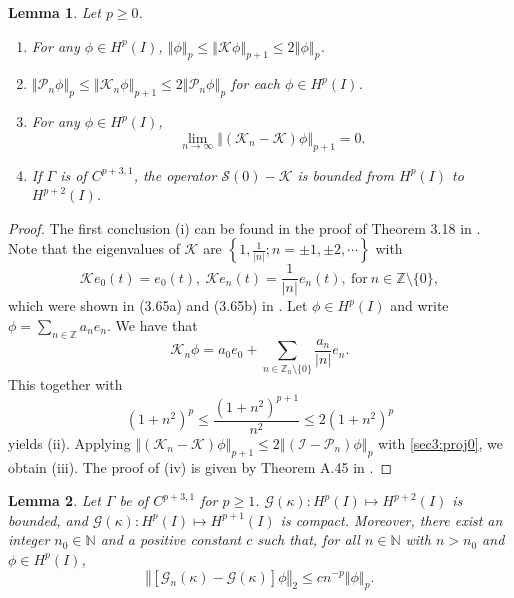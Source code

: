 \documentclass{article}
\newtheorem{lemma}{Lemma}[section]
\newcommand{\abs}[1]{\left\vert#1\right\vert}
\newcommand{\norm}[1]{\left\Vert#1\right\Vert}
\newcommand{\set}[1]{\left\{#1\right\}}
\begin{document}
	\begin{lemma}\label{sec3:lem1}
		Let  $p\geq0$.
				\begin{enumerate}
			\item[\rm (i)]For any $\phi\in H^{p}(I)$, $\norm{\phi}_{p}\leq\norm{\mathcal{K}\phi}_{p+1}\leq 2\norm{\phi}_{p}$. 
			\item[\rm(ii)] $\norm{\mathcal{P}_n\phi}_{p}\leq\norm{\mathcal{K}_n\phi}_{p+1}\leq 2\norm{\mathcal{P}_n\phi}_{p}$ for each $\phi\in H^{p}(I)$.
			\item[\rm(iii)] For any $\phi\in H^{p}(I)$,
			$$\lim_{n\to\infty}\norm{(\mathcal{K}_n-\mathcal{K})\phi}_{p+1}=0.$$
			\item[\rm(iv)] If $\Gamma$ is of $C^{p+3,1}$,
			the operator $\mathcal{S}(0)-\mathcal{K}$ is bounded from $H^{p}(I)$ to $H^{p+2}(I)$.
		\end{enumerate}
	\end{lemma}	
	\begin{proof}
    The first conclusion {\rm (i)} can be found in the proof of  Theorem 3.18 in \cite{Kirsch1996}. 	Note that	
	the eigenvalues of $\mathcal{K}$ are $\set{1,\frac{1}{\abs{n}};n=\pm1,\pm2,\cdots}$ with
	\begin{equation*}
		\mathcal{K}e_0(t)=e_0(t),~\mathcal{K}e_n(t)=\frac{1}{\abs{n}}e_n(t),~\text{for}~n\in\mathbb{Z}\setminus\{0\},
	\end{equation*}
	which were shown in (3.65a) and (3.65b) in \cite{Kirsch1996}. Let $\phi\in H^{p}(I)$ and write
	$\phi=\sum_{n\in\mathbb{Z}}a_ne_n$.
    We have that 
    \begin{equation*}
	\mathcal{K}_n\phi= a_0e_0+\sum_{n\in\mathbb{Z}_n\setminus\{0\}}\dfrac{a_n}{\abs{n}}e_n.
    \end{equation*}
    This together with 
    \begin{equation*}
    (1+n^2)^p\leq\dfrac{(1+n^2)^{p+1}}{n^2}\leq 2(1+n^2)^p
    \end{equation*}
   yields {\rm (ii)}.
   Applying $\norm{(\mathcal{K}_n-\mathcal{K})\phi}_{p+1}\leq 2\norm{(\mathcal{I}-\mathcal{P}_n)\phi}_{p}$ with \eqref{sec3:proj0}, we obtain {\rm (iii)}. The proof of {\rm (iv)} is given by Theorem A.45 in \cite{Kirsch1996}.
   \end{proof}
	
	
	
	\begin{lemma}\label{sec3:lem2}
		Let $\Gamma$ be of $C^{p+3,1}$ for $p\geq1$.  
    $\mathcal{G}(\kappa):H^p(I)\mapsto H^{p+2}(I)$ is bounded, and $\mathcal{G}(\kappa):H^p(I)\mapsto H^{p+1}(I)$ is compact. Moreover,
	there exist an integer $n_0\in\mathbb{N}$ and a positive constant $c$ such that, for all $n\in\mathbb{N}$ with $n>n_0$ and $\phi\in H^{p}(I)$,
	\begin{equation}\label{convergenceOrderGnE} 
		\norm{[\mathcal{G}_n(\kappa)-\mathcal{G}(\kappa)]\phi}_{2}\leq c n^{-p}\norm{\phi}_{p}.
	\end{equation}
	\end{lemma}
	
\end{document}
